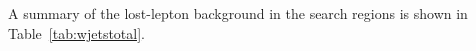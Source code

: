 A summary of the lost-lepton background in the search regions is shown in Table~\ref{tab:wjetstotal}.  




\newsavebox{\cutflowBoxf}
